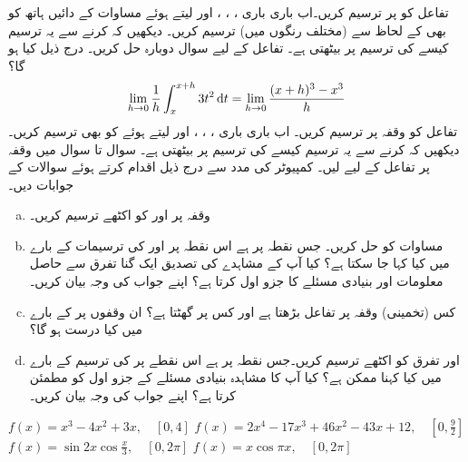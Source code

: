 تفاعل  کو  پر ترسیم کریں۔اب باری باری ، ، ، اور  لیتے ہوئے مساوات  کے دائیں ہاتھ کو بھی  کے لحاظ سے (مختلف رنگوں میں) ترسیم کریں۔ دیکھیں کہ  کرنے سے یہ ترسیم کیسے  کی ترسیم پر بیٹھتی ہے۔ 
تفاعل  کے لیے سوال  دوبارہ حل کریں۔ درج ذیل کیا ہو گا؟
\begin{align*}
\lim_{h\to0}\frac{1}{h}\int_x^{x+h}3t^2\dif t=\lim_{h\to 0}\frac{(x+h)^3-x^3}{h}
\end{align*}
 تفاعل  کو وقفہ  پر ترسیم کریں۔ اب باری باری ، ، ، اور   لیتے ہوئے  کو بھی ترسیم کریں۔ دیکھیں کہ  کرنے سے یہ ترسیم کیسے  کی ترسیم پر بیٹھتی  ہے۔
سوال  تا سوال  میں وقفہ  پر تفاعل  کے لیے  لیں۔ کمپیوٹر کی مدد سے درج ذیل اقدام کرتے ہوئے سوالات کے جوابات دیں۔
\begin{enumerate}[a.]
\item
وقفہ  پر  اور  کو اکٹھے ترسیم کریں۔
\item
مساوات  کو حل کریں۔ جس نقطہ پر   ہے اس نقطہ پر  اور  کی ترسیمات کے بارے میں کیا کہا جا سکتا ہے؟ کیا آپ کے  مشاہدے کی تصدیق ایک گنا تفرق  سے حاصل معلومات  اور بنیادی مسئلے کا  جزو اول  کرتا ہے؟ اپنے جواب کی وجہ بیان کریں۔
\item
کس (تخمینی) وقفہ پر تفاعل  بڑھتا ہے اور کس پر گھٹتا ہے؟ ان وقفوں پر  کے بارے میں کیا درست ہو گا؟
\item
{} اور تفرق  کو اکٹھے ترسیم کریں۔جس نقطہ پر  ہے اس نقطے پر  کی ترسیم کے بارے میں کیا کہنا ممکن ہے؟ کیا آپ کا مشاہدہ بنیادی مسئلے کے جزو اول کو مطمئن کرتا ہے؟ اپنے جواب کی وجہ بیان کریں۔ 
\end{enumerate} 
$f(x)=x^3-4x^2+3x,\quad [0,4]$
$f(x)=2x^4-17x^3+46x^2-43x+12,\quad [0,\tfrac{9}{2}]$
$f(x)=\sin2x\cos\tfrac{x}{3},\quad [0,2\pi]$
$f(x)=x\cos \pi x,\quad [0,2\pi]$
